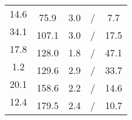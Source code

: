 \documentclass[11pt]{article}
\begin{document}
\begin{table}
\begin{tabular}{|ccccc|}
\multirow{2}{*}{14.6} & & & & \\ \cline{2-5} 
 & \multirow{2}{*}{75.9} & \multirow{2}{*}{3.0} & \multirow{2}{*}{/} & \multirow{2}{*}{7.7} \\ %
\multirow{2}{*}{34.1} & & & & \\ \cline{2-5} 
 & \multirow{2}{*}{107.1} & \multirow{2}{*}{3.0} & \multirow{2}{*}{/} & \multirow{2}{*}{17.5} \\ %
\multirow{2}{*}{17.8} & & & & \\ \cline{2-5} 
 & \multirow{2}{*}{128.0} & \multirow{2}{*}{1.8} & \multirow{2}{*}{/} & \multirow{2}{*}{47.1} \\ %
\multirow{2}{*}{1.2} & & & & \\ \cline{2-5} 
 & \multirow{2}{*}{129.6} & \multirow{2}{*}{2.9} & \multirow{2}{*}{/} & \multirow{2}{*}{33.7} \\ %
\multirow{2}{*}{20.1} & & & & \\ \cline{2-5} 
 & \multirow{2}{*}{158.6} & \multirow{2}{*}{2.2} & \multirow{2}{*}{/} & \multirow{2}{*}{14.6} \\ %
\multirow{2}{*}{12.4} & & & & \\ \cline{2-5} 
 & \multirow{2}{*}{179.5} & \multirow{2}{*}{2.4} & \multirow{2}{*}{/} & \multirow{2}{*}{10.7} \\ %
 & & & & \\ \hline
\end{tabular}
\end{table}
\end{document}
